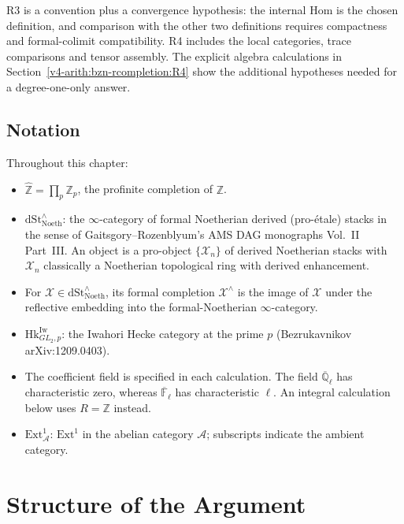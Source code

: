 R3 is a convention plus a convergence hypothesis: the internal Hom is
the chosen definition, and comparison with the other two definitions
requires compactness and formal-colimit compatibility. R4 includes
the local categories, trace comparisons and tensor assembly. The
explicit algebra calculations in Section~\ref{v4-arith:bzn-rcompletion:R4}
show the additional hypotheses needed for a degree-one-only answer.

\subsection{Notation}

Throughout this chapter:
\begin{itemize}
\item \(\widehat{\mathbb{Z}}=\prod_{p}\mathbb{Z}_{p}\), the profinite
completion of \(\mathbb{Z}\).
\item \(\mathrm{dSt}^{\wedge}_{\mathrm{Noeth}}\): the
\(\infty\)-category of formal Noetherian derived (pro-\'etale)
stacks in the sense of Gaitsgory--Rozenblyum's AMS DAG monographs
Vol.~II Part~III. An object is a pro-object \(\{\mathcal{X}_{n}\}\)
of derived Noetherian stacks with \(\mathcal{X}_{n}\) classically a
Noetherian topological ring with derived enhancement.
\item For \(\mathcal{X}\in\mathrm{dSt}^{\wedge}_{\mathrm{Noeth}}\),
its formal completion \(\mathcal{X}^{\wedge}\) is the image of
\(\mathcal{X}\) under the reflective embedding into the
formal-Noetherian \(\infty\)-category.
\item \(\mathrm{Hk}^{\mathrm{Iw}}_{GL_{2},p}\): the Iwahori Hecke
category at the prime \(p\) (Bezrukavnikov arXiv:1209.0403).
\item The coefficient field is specified in each calculation.
The field \(\overline{\mathbb Q}_\ell\) has characteristic zero,
whereas \(\overline{\mathbb F}_\ell\) has characteristic \(\ell\).
An integral calculation below uses \(R=\mathbb Z\) instead.
\item \(\mathrm{Ext}^{1}_{\mathcal{A}}\): \(\mathrm{Ext}^{1}\) in the
abelian category \(\mathcal{A}\); subscripts indicate the ambient
category.
\end{itemize}

\section{Structure of the Argument}
\label{v4-arith:bzn-rcompletion:table}

